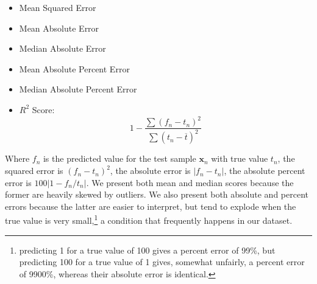 \documentclass[12pt]{book}
\begin{document}
\begin{itemize}
\item Mean Squared Error
\item Mean Absolute Error
\item Median Absolute Error
\item Mean Absolute Percent Error
\item Median Absolute Percent Error
\item $R^2$ Score:
$$
1-\frac{\sum (f_n-t_n)^2}{\sum (t_n-\overline{t})^2}
$$
\end{itemize}

Where $f_n$ is the predicted value for the test sample $\bm x_n$ with true value $t_n$, the squared error is $(f_n-t_n)^2$, the absolute error is $\vert f_n-t_n\vert$, the absolute percent error is $100\vert 1-f_n/t_n\vert$. We present both mean and median scores because the former are heavily skewed by outliers. We also present both absolute and percent errors because the latter are easier to interpret, but tend to explode when the true value is very small,\footnote{predicting 1 for a true value of 100 gives a percent error of 99\%, but predicting 100 for a true value of 1 gives, somewhat unfairly, a percent error of 9900\%, whereas their absolute error is identical.} a condition that frequently happens in our dataset.
\end{document}
